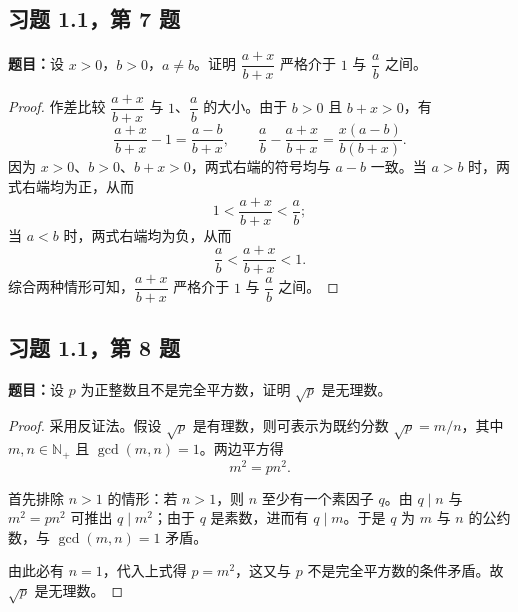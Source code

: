 \documentclass[UTF8, fontset=fandol, a4paper, 12pt]{ctexart}
\newcommand{\Nplus}{\mathbb{N}_{+}}
\theoremstyle{definition}
\begin{document}
\newpage
\subsection{习题 1.1，第 7 题}
\noindent\textbf{题目：}设 $x>0$，$b>0$，$a\ne b$。证明 $\dfrac{a+x}{b+x}$ 严格介于 $1$ 与 $\dfrac ab$ 之间。

\begin{proof}
作差比较 $\dfrac{a+x}{b+x}$ 与 $1$、$\dfrac ab$ 的大小。由于 $b>0$ 且 $b+x>0$，有
\[
 \frac{a+x}{b+x}-1=\frac{a-b}{b+x},\qquad
 \frac ab-\frac{a+x}{b+x}=\frac{x(a-b)}{b(b+x)}.
\]
因为 $x>0$、$b>0$、$b+x>0$，两式右端的符号均与 $a-b$ 一致。当 $a>b$ 时，两式右端均为正，从而
\[
 1<\frac{a+x}{b+x}<\frac ab;
\]
当 $a<b$ 时，两式右端均为负，从而
\[
 \frac ab<\frac{a+x}{b+x}<1.
\]
综合两种情形可知，$\dfrac{a+x}{b+x}$ 严格介于 $1$ 与 $\dfrac ab$ 之间。
\end{proof}

\subsection{习题 1.1，第 8 题}
\noindent\textbf{题目：}设 $p$ 为正整数且不是完全平方数，证明 $\sqrt p$ 是无理数。

\begin{proof}
采用反证法。假设 $\sqrt p$ 是有理数，则可表示为既约分数 $\sqrt p=m/n$，其中 $m,n\in\Nplus$ 且 $\gcd(m,n)=1$。两边平方得
\[
 m^2=pn^2.
\]

首先排除 $n>1$ 的情形：若 $n>1$，则 $n$ 至少有一个素因子 $q$。由 $q\mid n$ 与 $m^2=pn^2$ 可推出 $q\mid m^2$；由于 $q$ 是素数，进而有 $q\mid m$。于是 $q$ 为 $m$ 与 $n$ 的公约数，与 $\gcd(m,n)=1$ 矛盾。

由此必有 $n=1$，代入上式得 $p=m^2$，这又与 $p$ 不是完全平方数的条件矛盾。故 $\sqrt p$ 是无理数。
\end{proof}
\end{document}
